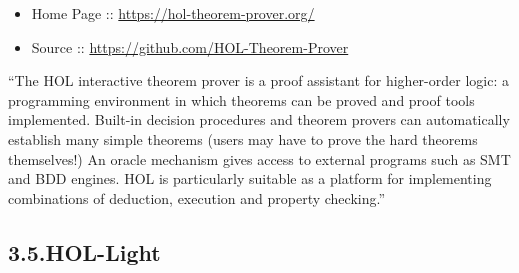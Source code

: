 \documentclass[12pt,twoside]{article}
\begin{document}
\begin{itemize}[noitemsep,topsep=\mdcompacttopsep]%

\item{}Home Page :: \href{https://hol-theorem-prover.org/}{{\ttfamily https://\hspace{0pt}hol-\hspace{0pt}theorem-\hspace{0pt}prover.\hspace{0pt}org/\hspace{0pt}}}%

\item{}Source :: \href{https://github.com/HOL-Theorem-Prover}{{\ttfamily https://\hspace{0pt}github.\hspace{0pt}com/\hspace{0pt}HOL-\hspace{0pt}Theorem-\hspace{0pt}Prover}}%
\end{itemize}%

\noindent{}\textquotedblleft{}The HOL interactive theorem prover is a proof assistant for
higher-order logic: a programming environment in which theorems can be
proved and proof tools implemented. Built-in decision procedures and
theorem provers can automatically establish many simple theorems
(users may have to prove the hard theorems themselves!) An oracle
mechanism gives access to external programs such as SMT and BDD
engines. HOL is particularly suitable as a platform for implementing
combinations of deduction, execution and property checking.\textquotedblright{}%

\subsection{3.5.\hspace*{0.5em}HOL-Light}\label{sec-hol-light}%
\end{document}
